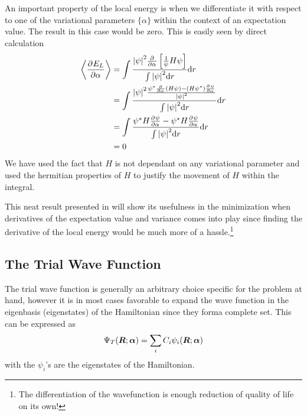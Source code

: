         An important property of the local energy is when we differentiate it
        with respect to one of the variational parameters $\{\alpha\}$ within
        the context of an expectation value. The result in this case would be
        zero. This is easily seen by direct calculation
            \begin{align}
                \ecp{\prd{\alpha}[E_L]} &= \int \frac{\abs{\psi}^2\prd{\alpha}
                \left[\frac{1}{\psi}H\psi\right]}{\int \abs{\psi}^2 \md r} \md
                r \nonumber \\
                &= \int \frac{\abs{\psi}^2 \frac{\psi^{*}\prd{\alpha}(H\psi) -
                (H\psi^{*}) \prd{\alpha}[\psi]}{\abs{\psi}^2}}{\int
                \abs{\psi}^2 \md r} \md r \nonumber \\
                &= \int \frac{\psi^{*}H\prd{\alpha}[\psi] -
                \psi^{*}H\prd{\alpha}[\psi]}{\int \abs{\psi}^2 \md r} \md r
                \nonumber \\
                &= 0
                \label{eq:expELdelzero}
            \end{align}
        We have used the fact that $H$ is not dependant on any variational
        parameter and used the hermitian properties\cite{GriffQuan} of $H$ to
        justify the movement of $H$ within the integral. 

        This neat result presented in  will show its
        usefulness in the minimization when derivatives of the expectation
        value and variance comes into play since finding the derivative of the
        local energy would be much more of a hassle.\footnote{The
        differentiation of the wavefunction is enough reduction of quality of
        life on its own!}

    \subsection{The Trial Wave Function}
        The trial wave function is generally an arbitrary choice specific for
        the problem at hand, however it is in most cases favorable to expand
        the wave function in the eigenbasis (eigenstates) of the Hamiltonian
        since they forma complete set. This can be expressed as
            \begin{equation}
                {\Psi}_T(\boldsymbol{{R}};\boldsymbol{{\alpha}}) = \sum_i C_i\psi_i(\boldsymbol{{R}};\boldsymbol{{\alpha}})
            \end{equation}
        with the $\psi_i$'s are the eigenstates of the Hamiltonian.

